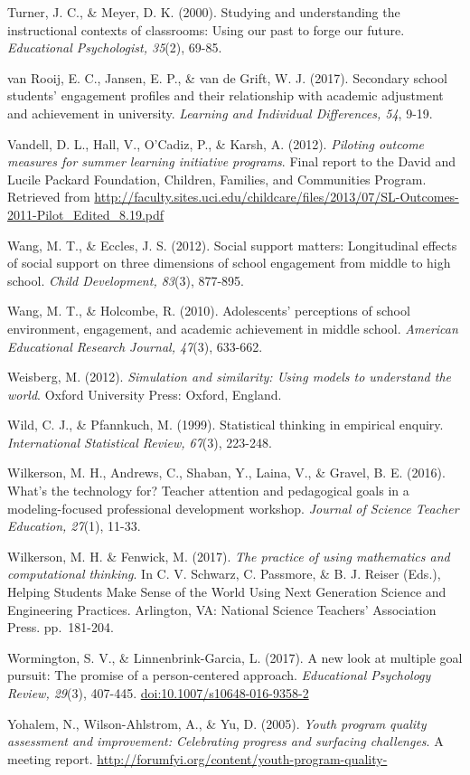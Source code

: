 \documentclass[]{msu-thesis}
\theoremstyle{definition}
\theoremstyle{definition}
\theoremstyle{definition}
\theoremstyle{remark}
\begin{document}
Turner, J. C., \& Meyer, D. K. (2000). Studying and understanding the
instructional contexts of classrooms: Using our past to forge our
future. \emph{Educational Psychologist, 35}(2), 69-85.

van Rooij, E. C., Jansen, E. P., \& van de Grift, W. J. (2017).
Secondary school students' engagement profiles and their relationship
with academic adjustment and achievement in university. \emph{Learning
and Individual Differences, 54}, 9-19.

Vandell, D. L., Hall, V., O'Cadiz, P., \& Karsh, A. (2012).
\emph{Piloting outcome measures for summer learning initiative
programs}. Final report to the David and Lucile Packard Foundation,
Children, Families, and Communities Program. Retrieved from
\url{http://faculty.sites.uci.edu/childcare/files/2013/07/SL-Outcomes-2011-Pilot_Edited_8.19.pdf}

Wang, M. T., \& Eccles, J. S. (2012). Social support matters:
Longitudinal effects of social support on three dimensions of school
engagement from middle to high school. \emph{Child Development, 83}(3),
877-895.

Wang, M. T., \& Holcombe, R. (2010). Adolescents' perceptions of school
environment, engagement, and academic achievement in middle school.
\emph{American Educational Research Journal, 47}(3), 633-662.

Weisberg, M. (2012). \emph{Simulation and similarity: Using models to
understand the world}. Oxford University Press: Oxford, England.

Wild, C. J., \& Pfannkuch, M. (1999). Statistical thinking in empirical
enquiry. \emph{International Statistical Review, 67}(3), 223-248.

Wilkerson, M. H., Andrews, C., Shaban, Y., Laina, V., \& Gravel, B. E.
(2016). What's the technology for? Teacher attention and pedagogical
goals in a modeling-focused professional development workshop.
\emph{Journal of Science Teacher Education, 27}(1), 11-33.

Wilkerson, M. H. \& Fenwick, M. (2017). \emph{The practice of using
mathematics and computational thinking}. In C. V. Schwarz, C. Passmore,
\& B. J. Reiser (Eds.), Helping Students Make Sense of the World Using
Next Generation Science and Engineering Practices. Arlington, VA:
National Science Teachers' Association Press. pp.~181-204.

Wormington, S. V., \& Linnenbrink-Garcia, L. (2017). A new look at
multiple goal pursuit: The promise of a person-centered approach.
\emph{Educational Psychology Review, 29}(3), 407-445.
\url{doi:10.1007/s10648-016-9358-2}

Yohalem, N., Wilson-Ahlstrom, A., \& Yu, D. (2005). \emph{Youth program
quality assessment and improvement: Celebrating progress and surfacing
challenges}. A meeting report.
\url{http://forumfyi.org/content/youth-program-quality-}


\end{document}
